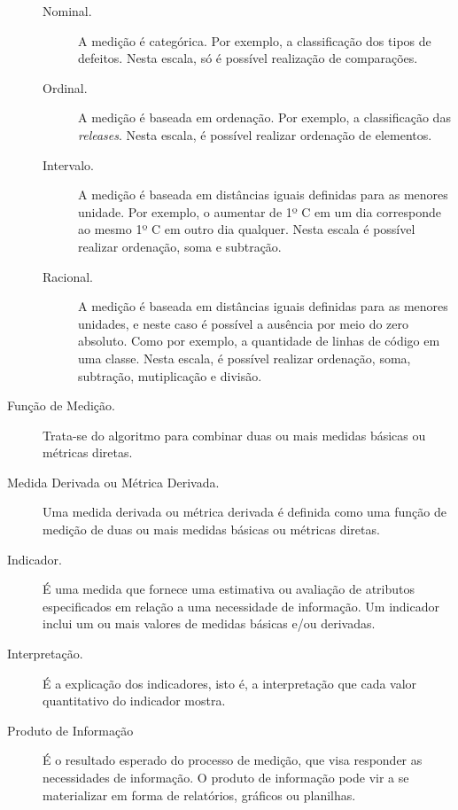 \begin{description}
		\begin{description}
		 	\item [Nominal.] A medição é categórica. Por exemplo, a classificação dos tipos de defeitos. Nesta escala, só é possível realização de comparações.
			\item [Ordinal.] A medição é baseada em ordenação. Por exemplo, a classificação das \textit{releases}. Nesta escala, é possível realizar ordenação de elementos.
		 	\item [Intervalo.]A medição é baseada em distâncias iguais definidas para as menores unidade. Por exemplo, o aumentar de 1º C em um dia corresponde ao mesmo 1º C em outro dia qualquer. Nesta escala é possível realizar ordenação, soma e subtração.
		 	\item [Racional.] A medição é baseada em distâncias iguais definidas para as menores unidades, e neste caso é possível a ausência por meio do zero absoluto. Como por exemplo, a quantidade de linhas de código em uma classe. Nesta escala, é possível realizar ordenação, soma, subtração, mutiplicação e divisão.
		\end{description}
	 \item [Função de Medição.] Trata-se do algoritmo para combinar duas ou mais medidas básicas ou métricas diretas.
	 \item [Medida Derivada ou Métrica Derivada.] Uma medida derivada ou métrica derivada é definida como uma função de medição de duas ou mais medidas básicas ou métricas diretas.
	
	 \item [Indicador.]  É uma medida que fornece uma estimativa ou avaliação de atributos especificados em relação a uma necessidade de informação. Um indicador inclui um ou mais valores de medidas básicas e/ou derivadas.

	\item [Interpretação.]  É a explicação dos indicadores, isto é, a interpretação que cada valor quantitativo do indicador mostra.
	
	\item [Produto de Informação] É o resultado esperado do processo de medição, que visa responder as necessidades de informação. O produto de informação pode vir a se materializar em forma de relatórios, gráficos ou planilhas.
	\end{description}


